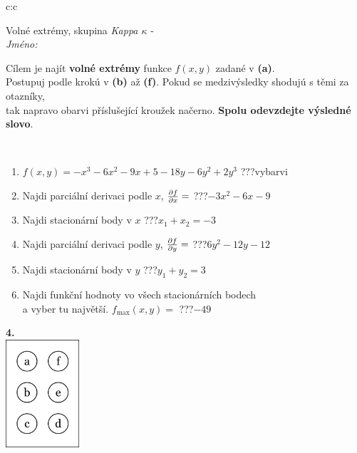 \documentclass[10pt]{report}
\begin{document}
\begin{tabular}{c:c}
\begin{minipage}[c][104.5mm][t]{0.5\linewidth}
\begin{center}
\vspace{7mm}
{\huge Volné extrémy, skupina \textit{Kappa $\kappa$} -}\\[5mm]
\textit{Jméno:}\phantom{xxxxxxxxxxxxxxxxxxxxxxxxxxxxxxxxxxxxxxxxxxxxxxxxxxxxxxxxxxxxxxxxx}\\[5mm]
\begin{minipage}{0.95\linewidth}
\begin{center}
Cílem je najít \textbf{volné extrémy} funkce $f(x,y)$ zadané v \textbf{(a)}.\\Postupuj podle krokú v \textbf{(b)} až \textbf{(f)}. Pokud se medzivýsledky shodujú s těmi za otazníky,\\tak napravo obarvi příslušející kroužek načerno. \textbf{Spolu odevzdejte výsledné slovo}.
\end{center}
\end{minipage}
\\[1mm]
\begin{minipage}{0.79\linewidth}
\begin{center}
\begin{varwidth}{\linewidth}
\begin{enumerate}
\normalsize
\item $f(x,y)=-x^3-6x^2-9x+5-18y-6y^2+2y^3$\quad \dotfill\; ???\;\dotfill \quad vybarvi
\item Najdi parciální derivaci podle $x$, $\pdv{f}{x}=$\quad \dotfill\; ???\;\dotfill \quad $-3x^2-6x-9$
\item Najdi stacionární body v $x$\quad \dotfill\; ???\;\dotfill \quad $x_1+x_2=-3$
\item Najdi parciální derivaci podle $y$, $\pdv{f}{y}=$\quad \dotfill\; ???\;\dotfill \quad $6y^2-12y-12$
\item Najdi stacionární body v $y$\quad \dotfill\; ???\;\dotfill \quad $y_1+y_2=3$
\item Najdi funkční hodnoty vo všech stacionárních bodech \\ \phantom{xxxxxx} a vyber tu najvětší. $f_{\text{max}}(x,y)=$\quad \dotfill\; ???\;\dotfill \quad $-49$
\end{enumerate}
\end{varwidth}
\end{center}
\end{minipage}
\begin{minipage}{0.20\linewidth}
\begin{center}
{\Huge\bfseries 4.} \\[2mm]
\includegraphics[height=40mm]{../images/braille.png}

\end{center}
\end{minipage}
\end{center}
\end{minipage}
\end{tabular}
\end{document}
